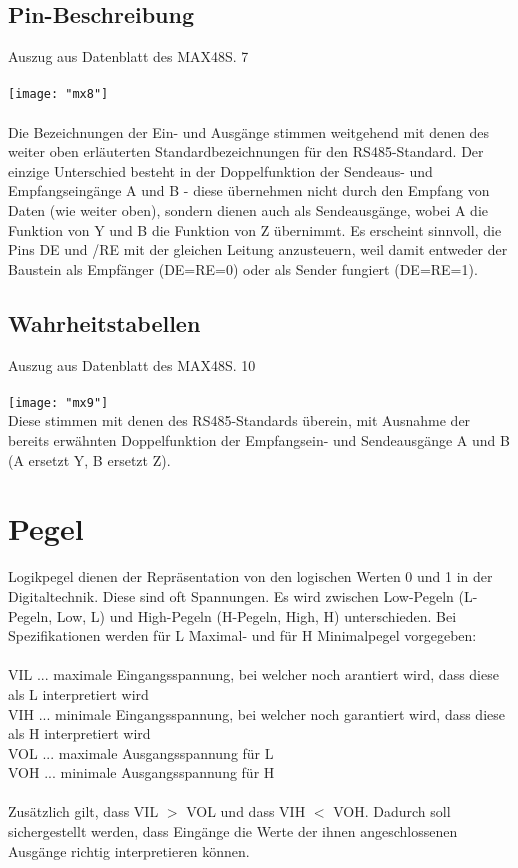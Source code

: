 \documentclass[11pt]{report}
\begin{document}
		\subsection{Pin-Beschreibung}
			Auszug aus Datenblatt des MAX48S. 7\\
			\\\texttt{[image: "mx8"]}\\
			\\Die Bezeichnungen der Ein- und Ausgänge stimmen weitgehend mit denen des weiter oben erläuterten Standardbezeichnungen für den RS485-Standard. Der einzige Unterschied besteht in der Doppelfunktion der Sendeaus- und Empfangseingänge A und B - diese übernehmen nicht durch den Empfang von Daten (wie weiter oben), sondern dienen auch als Sendeausgänge, wobei A die Funktion von Y und B die Funktion von Z übernimmt. Es erscheint sinnvoll, die Pins DE und /RE mit der gleichen Leitung anzusteuern, weil damit entweder der Baustein als Empfänger (DE=RE=0) oder als Sender fungiert (DE=RE=1).
		\subsection{Wahrheitstabellen}
			Auszug aus Datenblatt des MAX48S. 10\\
			\\\texttt{[image: "mx9"]}\\
			Diese stimmen mit denen des RS485-Standards überein, mit Ausnahme der bereits erwähnten Doppelfunktion der Empfangsein- und Sendeausgänge A und B (A ersetzt Y, B ersetzt Z).
	\section{Pegel}
		Logikpegel dienen der Repräsentation von den logischen Werten 0 und 1 in der Digitaltechnik. Diese sind oft Spannungen. Es wird zwischen Low-Pegeln (L-Pegeln, Low, L) und High-Pegeln (H-Pegeln, High, H) unterschieden. Bei Spezifikationen werden für L Maximal- und für H Minimalpegel vorgegeben:\\
		\\V{\tiny IL} ... maximale Eingangsspannung, bei welcher noch arantiert wird, dass diese als L interpretiert wird\\
		V{\tiny IH} ... minimale Eingangsspannung, bei welcher noch garantiert wird, dass diese als H interpretiert wird\\
		V{\tiny OL} ... maximale Ausgangsspannung für L\\
		V{\tiny OH} ... minimale Ausgangsspannung für H\\
		\\Zusätzlich gilt, dass V{\tiny IL} $>$ V{\tiny OL} und dass V{\tiny IH} $<$ V{\tiny OH}. Dadurch soll sichergestellt werden, dass Eingänge die Werte der ihnen angeschlossenen Ausgänge richtig interpretieren können.
\end{document}
